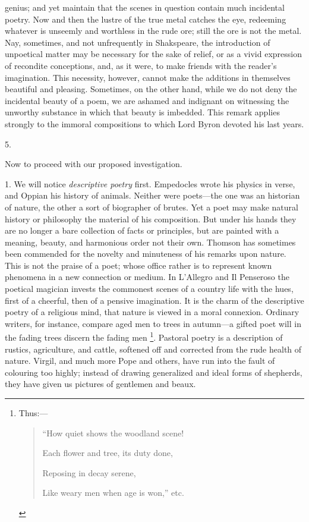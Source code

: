genius; and yet maintain that the scenes in question contain much
incidental poetry. Now and then the lustre of the true metal catches
the eye, redeeming whatever is unseemly and worthless in the rude ore;
still the ore is not the metal. Nay, sometimes, and not unfrequently
in Shakspeare, the introduction of unpoetical matter may be necessary
for the sake of relief, or as a vivid expression of recondite
conceptions, and, as it were, to make friends with the reader's
imagination. This necessity, however, cannot make the additions in
themselves beautiful and pleasing. Sometimes, on the other hand, while
we do not deny the incidental beauty of a poem, we are ashamed and
indignant on witnessing the unworthy substance in which that
beauty is imbedded. This remark applies strongly to the immoral
compositions to which Lord Byron devoted his last years.

5.

Now to proceed with our proposed investigation.

1. We will notice \emph{descriptive poetry} first. Empedocles wrote
his physics in verse, and Oppian his history of animals. Neither were
poets—the one was an historian of nature, the other a sort of
biographer of brutes. Yet a poet may make natural history or
philosophy the material of his composition. But under his hands they
are no longer a bare collection of facts or principles, but are
painted with a meaning, beauty, and harmonious order not their own.
Thomson has sometimes been commended for the novelty and minuteness of
his remarks upon nature. This is not the praise of a poet; whose
office rather is to represent known phenomena in a new connection or
medium. In L'Allegro and Il Penseroso the poetical magician invests
the commonest scenes of a country life with the hues, first of a
cheerful, then of a pensive imagination. It is the charm of the
descriptive poetry of a religious mind, that nature is viewed in a
moral connexion. Ordinary writers, for instance, compare aged men to
trees in autumn—a gifted poet will in the fading trees discern the
fading men \footnote{Thus:—

\begin{quote}

``How quiet shows the woodland scene!

Each flower and tree, its duty done,

Reposing in decay serene,

Like weary men when age is won,'' etc.

\end{quote}}. Pastoral poetry
is a description of rustics, agriculture, and cattle, softened off and
corrected from the rude health of nature. Virgil, and much more Pope
and others, have run into the fault of colouring too highly;
instead of drawing generalized and ideal forms of shepherds, they have
given us pictures of gentlemen and beaux.

